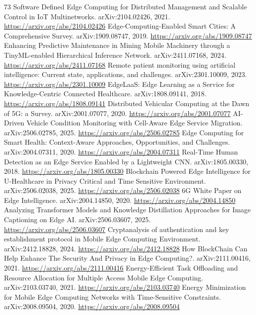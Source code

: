 \documentclass[11pt]{article}
\begin{document}
\begin{thebibliography}{73}
 Software Defined Edge Computing for Distributed Management and Scalable Control in IoT Multinetworks. arXiv:2104.02426, 2021. \url{https://arxiv.org/abs/2104.02426}
 Edge-Computing-Enabled Smart Cities: A Comprehensive Survey. arXiv:1909.08747, 2019. \url{https://arxiv.org/abs/1909.08747}
 Enhancing Predictive Maintenance in Mining Mobile Machinery through a TinyML-enabled Hierarchical Inference Network. arXiv:2411.07168, 2024. \url{https://arxiv.org/abs/2411.07168}
 Remote patient monitoring using artificial intelligence: Current state, applications, and challenges. arXiv:2301.10009, 2023. \url{https://arxiv.org/abs/2301.10009}
 EdgeLaaS: Edge Learning as a Service for Knowledge-Centric Connected Healthcare. arXiv:1808.09141, 2018. \url{https://arxiv.org/abs/1808.09141}
 Distributed Vehicular Computing at the Dawn of 5G: a Survey. arXiv:2001.07077, 2020. \url{https://arxiv.org/abs/2001.07077}
 AI-Driven Vehicle Condition Monitoring with Cell-Aware Edge Service Migration. arXiv:2506.02785, 2025. \url{https://arxiv.org/abs/2506.02785}
 Edge Computing for Smart Health: Context-Aware Approaches, Opportunities, and Challenges. arXiv:2004.07311, 2020. \url{https://arxiv.org/abs/2004.07311}
 Real-Time Human Detection as an Edge Service Enabled by a Lightweight CNN. arXiv:1805.00330, 2018. \url{https://arxiv.org/abs/1805.00330}
 Blockchain Powered Edge Intelligence for U-Healthcare in Privacy Critical and Time Sensitive Environment. arXiv:2506.02038, 2025. \url{https://arxiv.org/abs/2506.02038}
 6G White Paper on Edge Intelligence. arXiv:2004.14850, 2020. \url{https://arxiv.org/abs/2004.14850}
 Analyzing Transformer Models and Knowledge Distillation Approaches for Image Captioning on Edge AI. arXiv:2506.03607, 2025. \url{https://arxiv.org/abs/2506.03607}
 Cryptanalysis of authentication and key establishment protocol in Mobile Edge Computing Environment. arXiv:2412.18828, 2024. \url{https://arxiv.org/abs/2412.18828}
 How BlockChain Can Help Enhance The Security And Privacy in Edge Computing?. arXiv:2111.00416, 2021. \url{https://arxiv.org/abs/2111.00416}
 Energy-Efficient Task Offloading and Resource Allocation for Multiple Access Mobile Edge Computing. arXiv:2103.03740, 2021. \url{https://arxiv.org/abs/2103.03740}
 Energy Minimization for Mobile Edge Computing Networks with Time-Sensitive Constraints. arXiv:2008.09504, 2020. \url{https://arxiv.org/abs/2008.09504}

\end{thebibliography}
\end{document}
